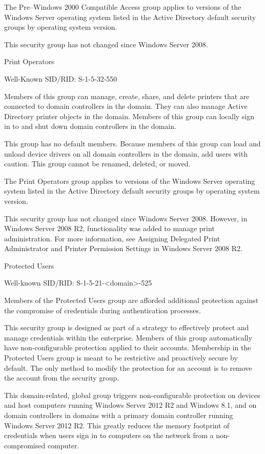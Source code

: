 The Pre–Windows 2000 Compatible Access group applies to versions of the Windows Server operating system listed in the Active Directory default security groups by operating system version.

This security group has not changed since Windows Server 2008.

Print Operators

Well-Known SID/RID: S-1-5-32-550

Members of this group can manage, create, share, and delete printers that are connected to domain controllers in the domain. They can also manage Active Directory printer objects in the domain. Members of this group can locally sign in to and shut down domain controllers in the domain.

This group has no default members. Because members of this group can load and unload device drivers on all domain controllers in the domain, add users with caution. This group cannot be renamed, deleted, or moved.

The Print Operators group applies to versions of the Windows Server operating system listed in the Active Directory default security groups by operating system version.

This security group has not changed since Windows Server 2008. However, in Windows Server 2008 R2, functionality was added to manage print administration. For more information, see Assigning Delegated Print Administrator and Printer Permission Settings in Windows Server 2008 R2.

Protected Users

Well-known SID/RID: S-1-5-21-<domain>-525

Members of the Protected Users group are afforded additional protection against the compromise of credentials during authentication processes.

This security group is designed as part of a strategy to effectively protect and manage credentials within the enterprise. Members of this group automatically have non-configurable protection applied to their accounts. Membership in the Protected Users group is meant to be restrictive and proactively secure by default. The only method to modify the protection for an account is to remove the account from the security group.

This domain-related, global group triggers non-configurable protection on devices and host computers running Windows Server 2012 R2 and Windows 8.1, and on domain controllers in domains with a primary domain controller running Windows Server 2012 R2. This greatly reduces the memory footprint of credentials when users sign in to computers on the network from a non-compromised computer.

